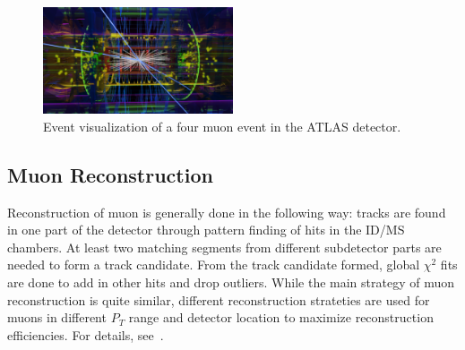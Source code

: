 \begin{figure}[!htb]
    \begin{center}
        \includegraphics[width=0.5\textwidth]{figures/common_ana/Muon}
        \caption{        
            Event visualization of a four muon event in the ATLAS detector\cite{ATLAS:1697053}.
        }
        \label{fig:muon}
    \end{center}
\end{figure}

\subsection{Muon Reconstruction}
Reconstruction of muon is generally done in the following way: tracks are found in one part of the detector through pattern finding of hits in the ID/MS chambers. At least two matching segments from different subdetector parts are needed to form a track candidate. From the track candidate formed, global $\chi^{2}$ fits are done to add in other hits and drop outliers. While the main strategy of muon reconstruction is quite similar, different reconstruction strateties are used for muons in
different $P_{T}$ range and detector location to maximize reconstruction efficiencies. For details, see~\cite{muonReco2016}.

